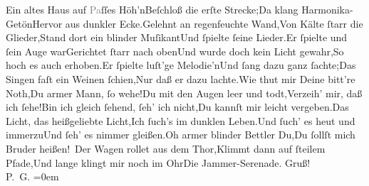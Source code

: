            \stanza{}\label{K_L02928-1v}\label{K_L02928-1h}\stanzaend{}\stanza{}Ein altes Haus auf \textcolor{gray}{Pa}ſſes Höh’n\newverse{}Beſchloß die erſte Strecke;\newverse{}Da klang Harmonika-Getön\newverse{}Hervor aus dunkler Ecke.\stanzaend{}\stanza{}Gelehnt an regenfeuchte Wand,\newverse{}Von Kälte ſtarr die Glieder,\newverse{}Stand dort ein blinder Muſikant\newverse{}Und ſpielte ſeine Lieder.\stanzaend{}\stanza{}Er ſpielte und ſein Auge war\newverse{}Gerichtet ſtarr nach oben\newverse{}Und wurde doch kein Licht gewahr,\newverse{}So hoch es auch erhoben.\stanzaend{}\stanza{}{\pb}Er ſpielte luſt’ge Melodie’n\newverse{}Und ſang dazu ganz ſachte;\newverse{}Das Singen faſt ein Weinen ſchien,\newverse{}Nur daß er dazu lachte.\stanzaend{}\stanza{}Wie thut mir Deine bitt’re Noth,\newverse{}Du armer Mann, ſo wehe!\newverse{}Du mit den Augen leer und todt,\newverse{}Verzeih’ mir, daß ich ſehe!\stanzaend{}\stanza{}Bin ich gleich ſehend, ſeh’ ich  nicht,\newverse{}Du kannſt mir leicht vergeben.\newverse{}Das Licht, das heißgeliebte Licht,\newverse{}Ich ſuch’s im dunklen Leben.\stanzaend{}\stanza{}Und ſuch’ es heut und immerzu\newverse{}Und ſeh’ es nimmer gleißen.\newverse{}Oh armer blinder Bettler Du,\newverse{}Du ſollſt mich Bruder heißen! {\dotssix}\stanzaend{}\stanza{}Der Wagen rollet aus dem Thor,\newverse{}Klimmt dann auf ſteilem Pfade,\newverse{}Und lange klingt mir noch im Ohr\newverse{}Die Jammer-Serenade.\stanzaend{}\pstart
           Gruß! {\\[\baselineskip]}\spacefill\mbox{P. G.}\pend
           \leftskip=0em{}\endnumbering{}  
      
